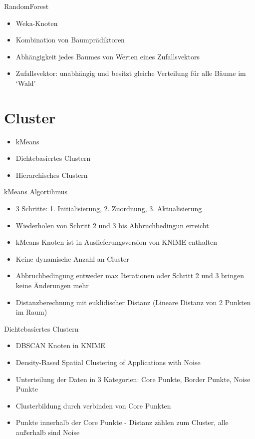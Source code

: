 \documentclass[
	handout,
  	aspectratio=169
]{beamer}
\begin{document}
		\begin{frame}{RandomForest}		
			\begin{itemize}
				\item Weka-Knoten
				\item Kombination von Baumprädiktoren
				\item Abhängigkeit jedes Baumes von Werten eines Zufallsvektors
				\item Zufallsvektor: unabhängig und besitzt gleiche Verteilung für alle Bäume im ‘Wald’
			\end{itemize}	
		\end{frame}
	
	\section{Cluster}	
	\frame{\sectionpage}	
		
		\begin{frame}
			\begin{itemize}
				\item kMeans
				\item Dichtebasiertes Clustern
				\item Hierarchisches Clustern
			\end{itemize}
		\end{frame}
		
		\begin{frame}{kMeans Algortihmus}
			\begin{itemize}
				\item 3 Schritte: 1. Initialisierung, 2. Zuordnung, 3. Aktualisierung
				\item Wiederholen von Schritt 2 und 3 bis Abbruchbedingun erreicht
				\item kMeans Knoten ist in Auslieferungsversion von KNIME enthalten
				\item Keine dynamische Anzahl an Cluster
				\item Abbruchbedingung entweder max Iterationen oder Schritt 2 und 3 bringen keine Änderungen mehr
				\item Distanzberechnung mit euklidischer Distanz (Lineare Distanz von 2 Punkten im Raum)
			\end{itemize}
		\end{frame}
		
		\begin{frame}{Dichtebasiertes Clustern}
			\begin{itemize}
				\item DBSCAN Knoten in KNIME
				\item Density-Based Spatial Clustering of Applications with Noise
				\item Unterteilung der Daten in 3 Kategorien: Core Punkte, Border Punkte, Noise Punkte
				\item Clusterbildung durch verbinden von Core Punkten
				\item Punkte innerhalb der Core Punkte - Distanz zählen zum Cluster, alle außerhalb sind Noise
			\end{itemize}
		\end{frame}
		
\end{document}
